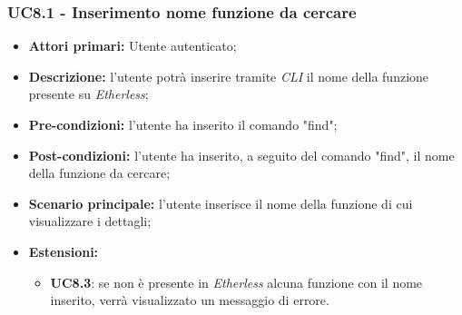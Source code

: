 \subsubsection{UC8.1 - Inserimento nome funzione da cercare}
\begin{itemize}
	\item \textbf{Attori primari:} Utente autenticato;
	\item \textbf{Descrizione:} l'utente potrà inserire tramite \textit{CLI\glo} il nome della funzione presente su \textit{Etherless};
	\item \textbf{Pre-condizioni:} l'utente ha inserito il comando "find";
	\item \textbf{Post-condizioni:} l'utente ha inserito, a seguito del comando "find", il nome della funzione da cercare;
	\item \textbf{Scenario principale:} l'utente inserisce il nome della funzione di cui visualizzare i dettagli;
	\item \textbf{Estensioni:}
	\begin{itemize}
		\item \textbf{UC8.3}: se non è presente in \textit{Etherless} alcuna funzione con il nome inserito, verrà visualizzato un messaggio di errore.
	\end{itemize}
\end{itemize}

